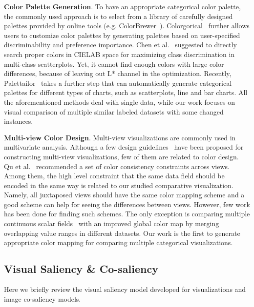 \vspace{1.5mm}
\noindent\textbf{Color Palette Generation}.
To have an appropriate categorical color palette, the commonly used approach is to select from
a library of carefully designed palettes provided by online tools (e.g. ColorBrewer~\cite{harrower2003colorbrewer}).
Colorgorical~\cite{Gramazio17} further allows users to customize color palettes by generating palettes based on user-specified discriminability and preference importance.
Chen et al.~\cite{Chen14}  suggested to directly search proper colors in CIELAB space for maximizing class discrimination in multi-class scatterplots. Yet, it cannot find enough colors with large color differences, because of leaving out L* channel in the optimization.
Recently, Palettailor~\cite{Lu21} takes a further step that can automatically generate categorical palettes for different types of charts, such as scatterplots, line and bar charts.
All the aforementioned methods deal with single data, while our work focuses on visual comparison of multiple similar labeled datasets with some changed instances.

\vspace{1.5mm}
\noindent\textbf{Multi-view Color Design}.
Multi-view visualizations are commonly used in multivariate analysis. Although a few design guidelines~\cite{wang2000guidelines} have been proposed for constructing multi-view visualizations, few of them are related to color design. Qu et al.~\cite{qu2017keeping} recommended a set of color consistency constraints across views.
Among them, the high level constraint that the same data field should be encoded in the same way is related to our studied comparative visualization. Namely, all juxtaposed views should have the same color mapping scheme and a good scheme can help for seeing the differences between views.
However, few work has been done for finding such schemes. The only exception is comparing multiple continuous scalar fields~\cite{Tominski08} with an improved global color map by merging overlapping value ranges in different datasets. Our work is the first to generate appropriate color mapping for comparing multiple categorical visualizations.



\subsection{Visual Saliency \& Co-saliency}
Here we briefly review the visual saliency model developed for visualizations and image co-saliency models.


